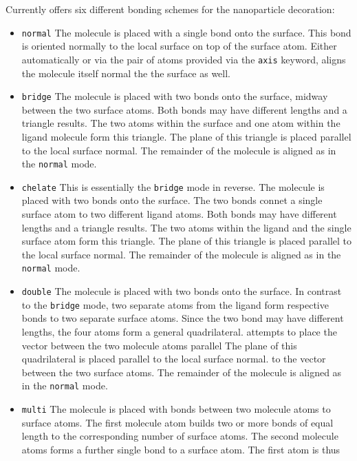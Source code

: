 Currently \Discus offers six different bonding schemes for the 
nanoparticle decoration:
\begin{itemize}
\item {\tt normal} The molecule is placed with a single bond onto the
      surface. This bond is oriented normally to the local surface
      on top of the surface atom.
      Either automatically or via the pair of atoms provided via the
      {\tt axis} keyword, \Discus aligns the molecule itself normal
      the the surface as well.
\item {\tt bridge} The molecule is placed with two bonds onto the
      surface, midway between the two surface atoms. Both bonds 
      may have different lengths and a triangle results. The 
      two atoms within the surface and one atom within the ligand
      molecule form this triangle.
      The plane of this triangle is placed parallel to the local 
      surface normal.
      The remainder of the molecule is 
      aligned as in the {\tt normal} mode.
\item {\tt chelate} This is essentially the {\tt bridge} mode in reverse.
      The molecule is placed with two bonds onto the surface. 
      The two bonds connet a single surface atom to two different 
      ligand atoms. Both bonds may have different lengths and a
      triangle results. The two atoms within the ligand and the
      single surface atom form this triangle.
      The plane of this triangle is placed parallel to the local
      surface normal.
      The remainder of the molecule is
      aligned as in the {\tt normal} mode.
\item {\tt double} The molecule is placed with two bonds onto the
      surface. In contrast to the {\tt bridge} mode, two separate
      atoms from the ligand form respective bonds to two separate 
      surface atoms. Since the two bond may have different lengths, 
      the four atoms form a general quadrilateral. \Discus attempts
      to place the vector between the two molecule atoms parallel
      The plane of this quadrilateral is placed parallel to the local 
      surface normal.
      to the vector between the two surface atoms.
      The remainder of the molecule is 
      aligned as in the {\tt normal} mode.
\item {\tt multi} The molecule is placed with bonds between two
      molecule atoms to surface atoms. The first molecule atom
      builds two or more bonds of equal length to the corresponding
      number of surface atoms. The second molecule atoms forms a
      further single bond to a surface atom. The first atom is thus 

\end{itemize}
